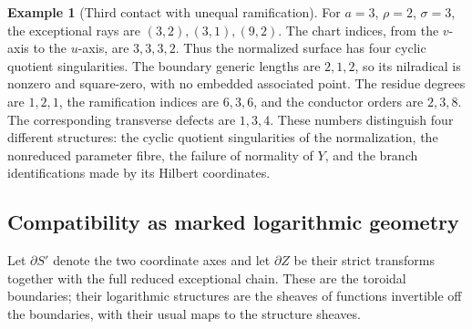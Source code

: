 \documentclass[11pt,reqno]{amsart}
\numberwithin{equation}{section}
\theoremstyle{definition}\newtheorem{definition}[theorem]{Definition}
\newtheorem{example}[theorem]{Example}
\theoremstyle{remark}\newtheorem{remark}[theorem]{Remark}
\begin{document}
\begin{example}[Third contact with unequal ramification]
\label{ex:third-ramified-v170}
For $a=3$, $\rho=2$, $\sigma=3$, the exceptional rays are
$(3,2),(3,1),(9,2)$. The chart indices, from the $v$-axis to the
$u$-axis, are $3,3,3,2$. Thus the normalized surface has four cyclic
quotient singularities. The boundary generic lengths are $2,1,2$,
so its nilradical is nonzero and square-zero, with no embedded
associated point. The residue degrees are $1,2,1$, the ramification
indices are $6,3,6$, and the conductor orders are $2,3,8$.
The corresponding transverse defects are $1,3,4$.
These numbers distinguish four different structures: the cyclic
quotient singularities of the normalization, the nonreduced
parameter fibre, the failure of normality of $Y$, and the branch
identifications made by its Hilbert coordinates.
\end{example}

\subsection{Compatibility as marked logarithmic geometry}
Let $\partial S'$ denote the two coordinate axes and let
$\partial Z$ be their strict transforms together with the full
reduced exceptional chain. These are the toroidal boundaries; their
logarithmic structures are the sheaves of functions invertible off
the boundaries, with their usual maps to the structure sheaves.
\end{document}
